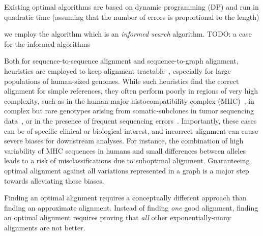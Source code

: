 Existing optimal algorithms are based on dynamic programming (DP) and
run in quadratic time (assuming that the number of errors is proportional to the
length)

we employ the \A algorithm which is an \emph{informed search} algorithm.
TODO: a case for the informed algorithms

Both for sequence-to-sequence alignment and sequence-to-graph alignment,
heuristics are employed to keep alignment
tractable~\cite{altschul_basic_1990,langmead_fast_2012,garrison_variation_2018},
especially for large populations of human-sized genomes.
%
While such heuristics find the correct alignment for simple references, they
often perform poorly in regions of very high complexity, such as in the human
major histocompatibility complex (MHC)~\cite{dilthey_improved_2015}, in complex
but rare genotypes arising from somatic-subclones in tumor sequencing
data~\cite{harismendy_detection_2011}, or in the presence of frequent sequencing
errors~\cite{salmela_lordec_2014}.
%
Importantly, these cases can be of specific clinical or biological interest, and
incorrect alignment can cause severe biases for downstream analyses. For
instance, the combination of high variability of MHC sequences in humans and
small differences between alleles~\cite{buhler_hla_2011} leads to a risk of
misclassifications due to suboptimal alignment. Guaranteeing optimal alignment
against all variations represented in a graph is a major step towards
alleviating those biases.

Finding an optimal alignment requires a conceptually different approach than
finding an approximate alignment. Instead of finding \emph{one} good alignment,
finding an optimal alignment requires proving that \emph{all} other
exponentially-many alignments are not better.

